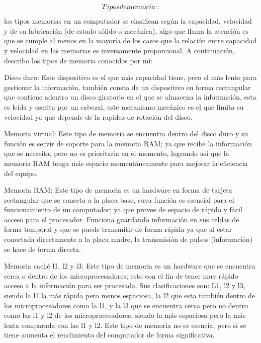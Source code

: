 \documentclass{article}
\begin{document}
    \vspace{0,5cm}
        \begin{align}
        
        \LARGE
        Tipos de memoria:
        
        \end{align}
los tipos memorias en un computador se clasifican según la capacidad, velocidad y de su fabricación (de estado sólido o mecánica), algo que llama la atención es que se cumple al menos en la mayoría de los casos que la relación entre capacidad y velocidad en las memorias es inversamente proporcional. A continuación, describo los tipos de memoria conocidos por mí:

    \vspace{0.5cm}
Disco duro: Este dispositivo es el que más capacidad tiene, pero el más lento para gestionar la información, también consta de un dispositivo en forma rectangular que contiene adentro un disco giratorio en el que se almacena la información, esta es leída y escrita por un cabezal, este mecanismo mecánico es el que limita su velocidad ya que depende de la rapidez de rotación del disco.

    \vspace{0.5cm}
Memoria virtual: Este tipo de memoria se encuentra dentro del disco duro y su función es servir de soporte para la memoria RAM; ya que recibe la información que se necesita, pero no es prioritaria en el momento, logrando asi que la memoria RAM tenga más espacio momentáneamente para mejorar la eficiencia del equipo.

    \vspace{0.5cm}
Memoria RAM: Este tipo de memoria es un hardware en forma de tarjeta rectangular que se conecta a la placa base, cuya función es esencial para el funcionamiento de un computador; ya que provee de espacio de rápido y fácil acceso para el procesador. Funciona guardando información en sus celdas de forma temporal y que se puede transmitir de forma rápida ya que al estar conectada directamente a la placa madre, la transmisión de pulsos (información) se hace de forma directa.

    \vspace{0.5cm}
Memoria caché l1, l2 y l3: Este tipo de memoria es un hardware que se encuentra cerca o dentro de los microprocesadores\cite{Profesor}; esto con el fin de tener muy rápido acceso a la información para ser procesada. Sus clasificaciones son: L1, l2 y l3, siendo la l1 la más rápida pero menos espaciosa, la l2 que esta también dentro de los microprocesadores como la l1, y la l3 que se encuentra cerca pero no dentro como las l1 y l2 de los microprocesadores, siendo la más espaciosa pero la más lenta comparada con las l1 y l2. Este tipo de memoria no es esencia, pero si se tiene aumenta el rendimiento del computador de forma significativa.
\end{document}
